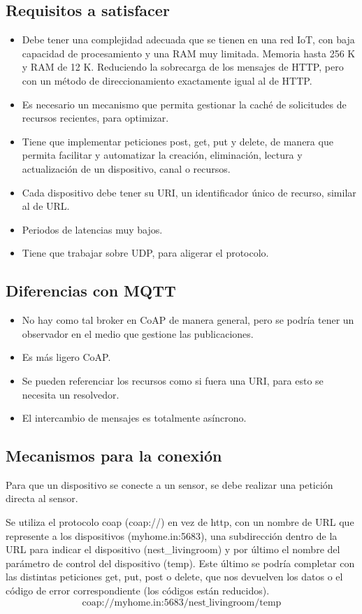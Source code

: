 \documentclass[12pt, twoside, openright]{report} %
\begin{document}
\subsection{Requisitos a satisfacer}
\begin{itemize}
	\item Debe tener una complejidad adecuada que se tienen en una red IoT, con baja capacidad de procesamiento y una RAM muy limitada. Memoria hasta 256 K y RAM de 12 K. Reduciendo la sobrecarga de los mensajes de HTTP, pero con un método de direccionamiento exactamente igual al de HTTP.
	\item Es necesario un mecanismo que permita gestionar la caché de solicitudes de recursos recientes, para optimizar.
	\item Tiene que implementar peticiones post, get, put y delete, de manera que permita facilitar y automatizar la creación, eliminación, lectura y actualización de un dispositivo, canal o recursos.
	\item Cada dispositivo debe tener su URI, un identificador único de recurso, similar al de URL.
	\item Periodos de latencias muy bajos.
	\item Tiene que trabajar sobre UDP, para aligerar el protocolo.
\end{itemize}

\subsection{Diferencias con MQTT}
\begin{itemize}
	\item No hay como tal broker en CoAP de manera general, pero se podría tener un observador en el medio que gestione las publicaciones.
	\item Es más ligero CoAP.
	\item Se pueden referenciar los recursos como si fuera una URI, para esto se necesita un resolvedor.
	\item El intercambio de mensajes es totalmente asíncrono.
\end{itemize}

\subsection{Mecanismos para la conexión}
Para que un dispositivo se conecte a un sensor, se debe realizar una petición directa al sensor.

Se utiliza el protocolo coap (coap://) en vez de http, con un nombre de URL que represente a los dispositivos (myhome.in:5683), una subdirección dentro de la URL para indicar el dispositivo (nest\_livingroom) y por último el nombre del parámetro de control del dispositivo (temp). Este último se podría completar con las distintas peticiones get, put, post o delete, que nos devuelven los datos o el código de error correspondiente (los códigos están reducidos). $$\text{coap://myhome.in:5683/nest\_livingroom/temp}$$
\end{document}

